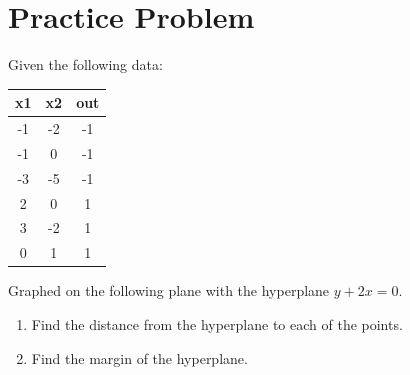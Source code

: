 \documentclass{article}
\begin{document}
\section{Practice Problem}
Given the following data:
\begin{center}
\begin{tabular}{ |c|c|c| } 
 \hline
 x1 & x2 & out \\
 \hline
 -1 & -2 & -1 \\ 
 -1 & 0 & -1 \\ 
 -3 & -5 & -1 \\ 
 2 & 0 & 1 \\ 
 3 & -2 & 1 \\
 0 & 1 & 1 \\
 
 \hline
\end{tabular}
\end{center}
Graphed on the following plane with the hyperplane $y + 2x =0$.
\begin{center}
\end{center}
\begin{enumerate}
\item Find the distance from the hyperplane to each of the points.
\item Find the margin of the hyperplane.
\end{enumerate}
\end{document}
